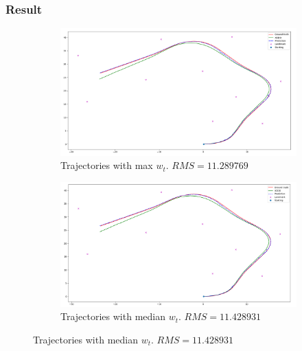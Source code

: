 \documentclass{article}
\begin{document}
%

\subsubsection{Result} 
\begin{figure}[h!]
\centering
\begin{subfigure}[b]{0.8\linewidth}
	\includegraphics[width=\textwidth]{max.png}
	\caption{Trajectories with max $w_t$. $RMS = 11.289769$}\label{fig:image-1}
\end{subfigure}
\begin{subfigure}[b]{0.8\linewidth}
	\includegraphics[width=\textwidth]{median.png}
	\caption{Trajectories with median $w_t$. $RMS = 11.428931$}\label{fig:image-2}
\end{subfigure}

\end{figure}
\end{document}
